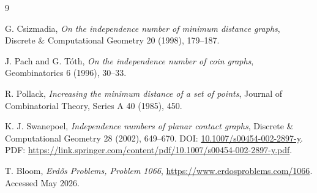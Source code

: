\documentclass[11pt]{article}
\begin{document}
\newpage
\begin{thebibliography}{9}

G. Csizmadia,
\textit{On the independence number of minimum distance graphs},
Discrete \& Computational Geometry 20 (1998), 179--187.

J. Pach and G. T\'oth,
\textit{On the independence number of coin graphs},
Geombinatorics 6 (1996), 30--33.

R. Pollack,
\textit{Increasing the minimum distance of a set of points},
Journal of Combinatorial Theory, Series A 40 (1985), 450.

K. J. Swanepoel,
\textit{Independence numbers of planar contact graphs},
Discrete \& Computational Geometry 28 (2002), 649--670.
DOI: \href{https://doi.org/10.1007/s00454-002-2897-y}{10.1007/s00454-002-2897-y}.
PDF: \url{https://link.springer.com/content/pdf/10.1007/s00454-002-2897-y.pdf}.

T. Bloom, \textit{Erd\H{o}s Problems, Problem 1066},
\url{https://www.erdosproblems.com/1066}.
Accessed May 2026.

\end{thebibliography}
\end{document}
